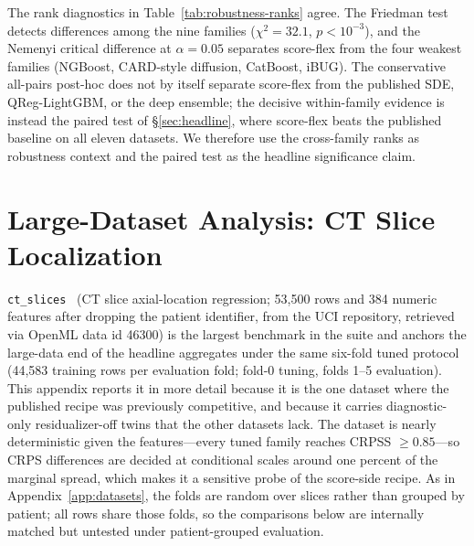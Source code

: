 \documentclass{article}
\begin{document}
The rank diagnostics in Table~\ref{tab:robustness-ranks} agree. The Friedman test detects differences among the nine families ($\chi^2=32.1$, $p<10^{-3}$), and the Nemenyi critical difference at $\alpha=0.05$ separates score-flex from the four weakest families (NGBoost, CARD-style diffusion, CatBoost, iBUG). The conservative all-pairs post-hoc does not by itself separate score-flex from the published SDE, QReg-LightGBM, or the deep ensemble; the decisive within-family evidence is instead the paired test of \S\ref{sec:headline}, where score-flex beats the published baseline on all eleven datasets. We therefore use the cross-family ranks as robustness context and the paired test as the headline significance claim.

\section{Large-Dataset Analysis: CT Slice Localization}\label{app:large-data}

\texttt{ct\_slices}~\citep{graf2011ctslices} (CT slice axial-location regression; 53{,}500 rows and 384 numeric features after dropping the patient identifier, from the UCI repository, retrieved via OpenML data id 46300) is the largest benchmark in the suite and anchors the large-data end of the headline aggregates under the same six-fold tuned protocol (44{,}583 training rows per evaluation fold; fold-0 tuning, folds 1--5 evaluation). This appendix reports it in more detail because it is the one dataset where the published recipe was previously competitive, and because it carries diagnostic-only residualizer-off twins that the other datasets lack. The dataset is nearly deterministic given the features---every tuned family reaches CRPSS $\geq 0.85$---so CRPS differences are decided at conditional scales around one percent of the marginal spread, which makes it a sensitive probe of the score-side recipe. As in Appendix~\ref{app:datasets}, the folds are random over slices rather than grouped by patient; all rows share those folds, so the comparisons below are internally matched but untested under patient-grouped evaluation.
\end{document}
